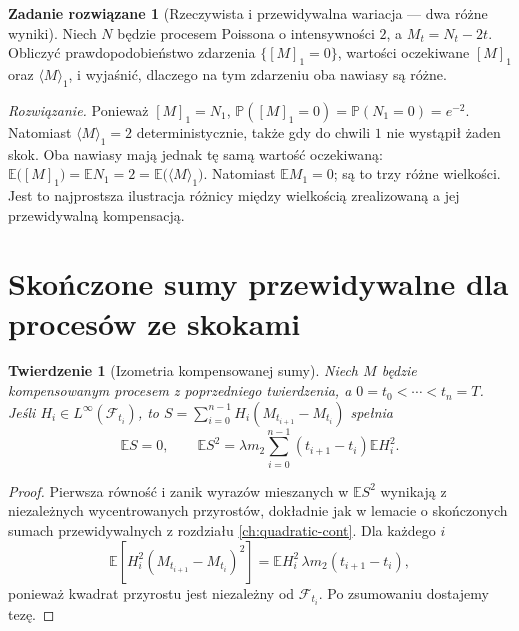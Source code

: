 \documentclass[11pt,a4paper,oneside]{report}
\numberwithin{equation}{chapter}
\theoremstyle{plain}
\newtheorem{twierdzenie}{Twierdzenie}[chapter]
\theoremstyle{definition}
\newtheorem{zadanie}{Zadanie rozwiązane}[chapter]
\theoremstyle{remark}
\newcommand{\Prob}{\mathbb{P}}
\newcommand{\E}{\mathbb{E}}
\newcommand{\calF}{\mathcal{F}}
\begin{document}
\begin{zadanie}[Rzeczywista i przewidywalna wariacja --- dwa różne wyniki]
Niech $N$ będzie procesem Poissona o intensywności $2$,
a $M_t=N_t-2t$. Obliczyć prawdopodobieństwo zdarzenia
$\{[M]_1=0\}$, wartości oczekiwane $[M]_1$ oraz
$\langle M\rangle_1$, i wyjaśnić, dlaczego na tym
zdarzeniu oba nawiasy są różne.

\emph{Rozwiązanie.} Ponieważ $[M]_1=N_1$,
$\Prob([M]_1=0)=\Prob(N_1=0)=e^{-2}$.
Natomiast $\langle M\rangle_1=2$ deterministycznie,
także gdy do chwili $1$ nie wystąpił żaden skok.
Oba nawiasy mają jednak tę samą wartość oczekiwaną:
$\E\bigl([M]_1\bigr)=\E N_1=2
=\E\bigl(\langle M\rangle_1\bigr)$.
Natomiast $\E M_1=0$; są to trzy różne wielkości.
Jest to najprostsza ilustracja różnicy między wielkością
zrealizowaną a jej przewidywalną kompensacją.
\end{zadanie}


\section{Skończone sumy przewidywalne dla procesów ze skokami}
\begin{twierdzenie}[Izometria kompensowanej sumy]
Niech $M$ będzie kompensowanym procesem z poprzedniego
twierdzenia, a $0=t_0<\cdots<t_n=T$.
Jeśli $H_i\in L^\infty(\calF_{t_i})$, to
$S=\sum_{i=0}^{n-1}H_i(M_{t_{i+1}}-M_{t_i})$
spełnia
\[
\E S=0,\qquad
\E S^2=\lambda m_2\sum_{i=0}^{n-1}
(t_{i+1}-t_i)\E H_i^2.
\]
\end{twierdzenie}
\begin{proof}
Pierwsza równość i zanik wyrazów mieszanych w
$\E S^2$ wynikają z niezależnych wycentrowanych
przyrostów, dokładnie jak w lemacie o skończonych
sumach przewidywalnych z rozdziału
\ref{ch:quadratic-cont}. Dla każdego $i$
\[
\E[H_i^2(M_{t_{i+1}}-M_{t_i})^2]
=\E H_i^2\,\lambda m_2(t_{i+1}-t_i),
\]
ponieważ kwadrat przyrostu jest niezależny od
$\calF_{t_i}$. Po zsumowaniu dostajemy tezę.
\end{proof}
\end{document}
